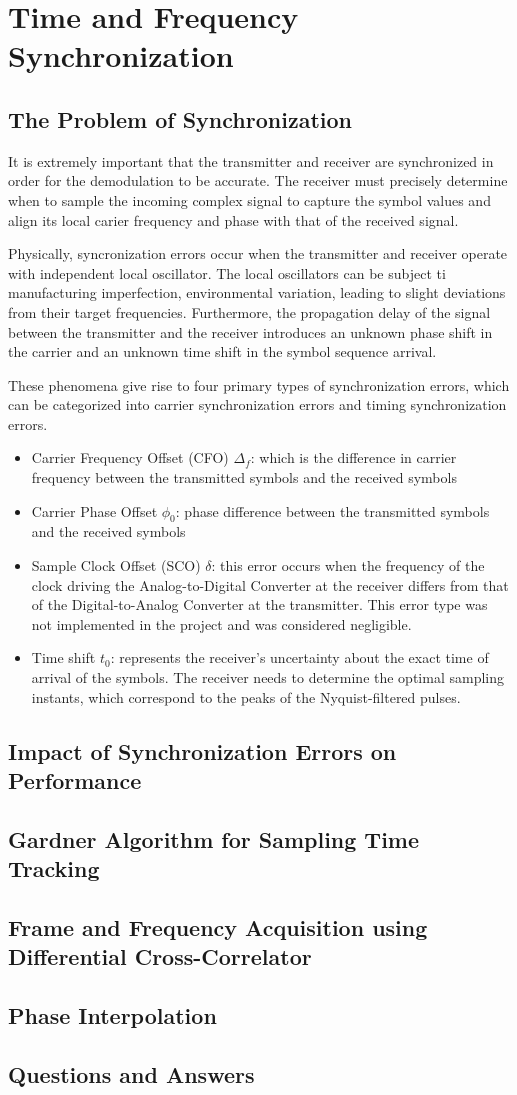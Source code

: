 \section{Time and Frequency Synchronization}
\subsection{The Problem of Synchronization}
It is extremely important that the transmitter and receiver are synchronized in order for the demodulation to be accurate. The receiver must precisely determine when to sample the incoming complex signal to capture the symbol values and align its local carier frequency and phase with that of the received signal. \par
Physically, syncronization errors occur when the transmitter and receiver operate with independent local oscillator. The local oscillators can be subject ti manufacturing imperfection, environmental variation, leading to slight deviations from their target frequencies. Furthermore, the propagation delay of the signal between the transmitter and the receiver introduces an unknown phase shift in the carrier and an unknown time shift in the symbol sequence arrival.\par
These phenomena give rise to four primary types of synchronization errors, which can be categorized into carrier synchronization errors and timing synchronization errors.
\begin{itemize}
	\item Carrier Frequency Offset (CFO) $\Delta_f$: which is the difference in carrier frequency between the transmitted symbols and the received symbols
	\item Carrier Phase Offset $\phi_0$: phase difference between the transmitted symbols and the received symbols
	\item Sample Clock Offset (SCO) $\delta$: this error occurs when the frequency of the clock driving the Analog-to-Digital Converter at the receiver differs from that of the Digital-to-Analog Converter at the transmitter. This error type was not implemented in the project and was considered negligible.
	\item Time shift $t_0$: represents the receiver's uncertainty about the exact time of arrival of the symbols. The receiver needs to determine the optimal sampling instants, which correspond to the peaks of the Nyquist-filtered pulses.
\end{itemize}

\subsection{Impact of Synchronization Errors on Performance}
\subsection{Gardner Algorithm for Sampling Time Tracking}
\subsection{Frame and Frequency Acquisition using Differential Cross-Correlator}
\subsection{Phase Interpolation}
\subsection{Questions and Answers}